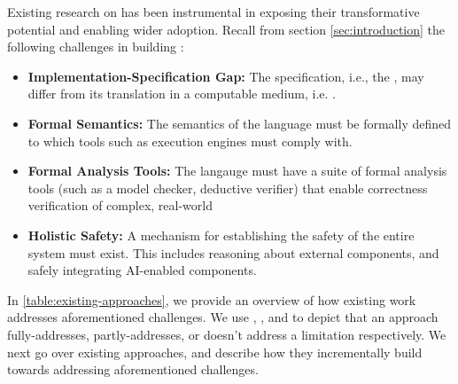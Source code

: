 Existing research on \CDSSs{} has been instrumental in exposing
their transformative potential and enabling wider adoption.
Recall from section \ref{sec:introduction} the following
challenges in building \CDSSs{}:
\begin{itemize}
  \item \textbf{Implementation-Specification Gap:} The specification,
    i.e., the \BPG{}, may differ from its translation in a computable
    medium, i.e. \CIG{}.
  \item \textbf{Formal Semantics:} The semantics
    of the \CIG{} language must be formally defined to which tools
    such as execution engines must comply with.

  \item \textbf{Formal Analysis Tools:} The langauge must have
    a suite of formal analysis tools (such as a model checker, deductive verifier)
    that enable correctness verification of complex, real-world \CDSSs{}

  \item \textbf{Holistic Safety:} A mechanism for establishing the safety
    of the entire system must exist. This includes reasoning about external
    components, and safely integrating AI-enabled components.
\end{itemize}

In \tablename{} \ref{table:existing-approaches}, we provide an overview of
how existing work addresses aforementioned challenges. We use
\greencheck{}, \cancelcheck{}, and \redcross{} to depict that an approach
fully-addresses, partly-addresses, or doesn't address a limitation respectively.
We next go over existing approaches, and describe how they incrementally
build towards addressing aforementioned challenges.

